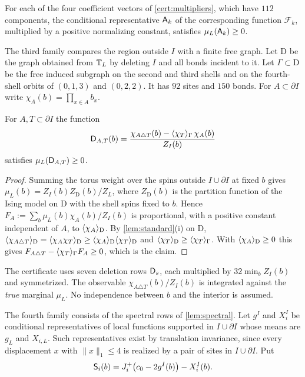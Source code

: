 \begin{lemma}\label{lem:reflection}
For each of the four coefficient vectors of \cref{cert:multipliers}, which have $112$ components, the conditional representative $\mathsf A_k$ of the corresponding function $\mathcal F_k$, multiplied by a positive normalizing constant, satisfies $\mu_L(\mathsf A_k)\ge0$.
\end{lemma}

The third family compares the region outside $I$ with a finite free graph. Let $\mathrm D$ be the graph obtained from $\mathbb T_L$ by deleting $I$ and all bonds incident to it. Let $\Gamma\subset\mathrm D$ be the free induced subgraph on the second and third shells and on the fourth-shell orbits of $(0,1,3)$ and $(0,2,2)$. It has $92$ sites and $150$ bonds. For $A\subset\partial I$ write $\chi_A(b)=\prod_{x\in A}b_x$.

\begin{lemma}\label{lem:deletion}
For $A,T\subset\partial I$ the function
\[
 \mathsf D_{A,T}(b)=\frac{\chi_{A\triangle T}(b)-\langle \chi_T\rangle_\Gamma\,\chi_A(b)}{Z_I(b)}
\]
satisfies $\mu_L(\mathsf D_{A,T})\ge0$.
\end{lemma}

\begin{proof}
Summing the torus weight over the spins outside $I\cup\partial I$ at fixed $b$ gives $\mu_L(b)=Z_I(b)Z_{\mathrm D}(b)/Z_L$, where $Z_{\mathrm D}(b)$ is the partition function of the Ising model on $\mathrm D$ with the shell spins fixed to $b$. Hence $F_A:=\sum_b\mu_L(b)\chi_A(b)/Z_I(b)$ is proportional, with a positive constant independent of $A$, to $\langle \chi_A\rangle_{\mathrm D}$. By \cref{lem:standard}(i) on $\mathrm D$, $\langle \chi_{A\triangle T}\rangle_{\mathrm D}=\langle \chi_A\chi_T\rangle_{\mathrm D}\ge\langle \chi_A\rangle_{\mathrm D}\langle \chi_T\rangle_{\mathrm D}$ and $\langle \chi_T\rangle_{\mathrm D}\ge\langle \chi_T\rangle_\Gamma$. With $\langle \chi_A\rangle_{\mathrm D}\ge0$ this gives $F_{A\triangle T}-\langle \chi_T\rangle_\Gamma F_A\ge0$, which is the claim.
\end{proof}

The certificate uses seven deletion rows $\mathsf D_s$, each multiplied by $32\min_bZ_I(b)$ and symmetrized. The observable $\chi_{A\triangle T}(b)/Z_I(b)$ is integrated against the \emph{true} marginal $\mu_L$. No independence between $b$ and the interior is assumed.

The fourth family consists of the spectral rows of \cref{lem:spectral}. Let $g^I$ and $X_i^I$ be conditional representatives of local functions supported in $I\cup\partial I$ whose means are $g_L$ and $X_{i,L}$. Such representatives exist by translation invariance, since every displacement $x$ with $\|x\|_1\le4$ is realized by a pair of sites in $I\cup\partial I$. Put
\[
 \mathsf S_i(b)=J_i^+\bigl(c_0-2g^I(b)\bigr)-X_i^I(b).
\]


